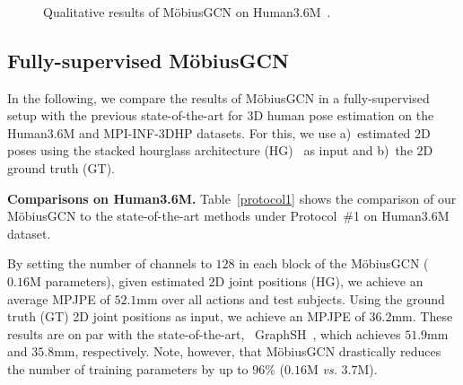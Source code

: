 \documentclass[runningheads]{llncs}
\begin{document}
\begin{figure*}
\centering
{}
\quad
{}
\quad
{}\\
\quad
{}
\quad
{}\\
\quad
{}
\quad
{}\\
\caption{Qualitative results of M\"obiusGCN on Human3.6M~\cite{h36m_pami}.}
\label{qual-res}
\end{figure*}

\vspace{-20px}
\subsection{ Fully-supervised M\"{o}biusGCN}
In the following, we compare the results of M\"obiusGCN in a fully-supervised setup with the previous state-of-the-art for 3D human pose estimation on the Human3.6M and MPI-INF-3DHP datasets. For this, we use a)~estimated 2D poses using the stacked hourglass architecture (HG)~\cite{newell2016stacked} as input and b)~the 2D ground truth (GT).

\textbf{Comparisons on Human3.6M.}
Table~\ref{protocol1} shows the comparison of our M\"obiusGCN to the state-of-the-art methods under Protocol~\#1 on Human3.6M dataset. 

By setting the number of channels to $128$ in each block of the M\"obiusGCN ($0.16\text{M}$ parameters), given estimated 2D joint positions (HG), we achieve an average MPJPE of $52.1\text{mm}$ over all actions and test subjects. Using the ground truth (GT) 2D joint positions as input, we achieve an MPJPE of $36.2\text{mm}$.
These results are on par with the state-of-the-art, \ie~GraphSH~\cite{xu2021graph}, which achieves $51.9\text{mm}$ and $35.8\text{mm}$, respectively.
Note, however, that M\"obiusGCN drastically reduces the number of training parameters by up to $96\%$ ($0.16\text{M}$ \emph{vs.} $3.7\text{M}$).
\end{document}
